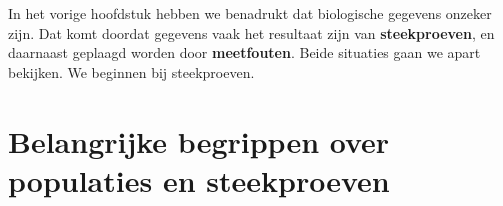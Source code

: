 \documentclass[
  a4paper,
]{scrbook}
\theoremstyle{definition}
\theoremstyle{definition}
\theoremstyle{remark}
\begin{document}
\renewcommand{\ttdefault}{lcmtt}
\providecommand{\ped}[1]{_\textrm{#1}}
\providecommand{\ap}[1]{^\textrm{#1}}
\providecommand{\app}[1]{^\textrm{#1}}

\providecommand*{\angs}{\smash{\mathrm{\ring A}}}
\providecommand*{\celsius}{\mathrm{~\circ C}}
\providecommand*{\micro}{\mu}

\providecommand*{\unit}[1]{\textrm{\,#1}}

\providecommand{\E}{\mathrm{e}}
\providecommand{\I}{\mathrm{i}}
\providecommand{\sfrac}[2]{^{#1}/_{#2}}

\providecommand{\conc}[1]{\left[\mathrm{#1}\right]}

\providecommand{\command}[1]{\textsl{#1}}
\providecommand{\out}[1]{\begin{verbatim}#1\end{verbatim}}

\providecommand{\diff}{\mathrm{d}\,}

\providecommand*{\deriv}[3][]{%
    \frac{\diff^{#1}#2}{\diff #3^{#1}}}
\providecommand*{\pderiv}[3][]{%
    \frac{\partial^{#1}#2}
        {\partial #3^{#1}}}

\renewcommand{\vec}[1]{{\boldsymbol #1}}

\providecommand{\cov}[2]{\mathrm{Cov}\!\left(#1, #2\right)}
\providecommand{\var}[1]{\mathrm{Var}\!\left(#1\right)}

\providecommand{\mean}[1]{\overline{#1}}

\providecommand{\sd}[1]{\sigma\left(#1\right)}
\providecommand{\ev}[1]{\mathbb{E}\!\left(#1\right)}
\providecommand{\pr}[1]{\textrm{Pr}\!\left(#1\right)}

\providecommand{\se}[1]{\mathrm{SE}_{#1}}

\providecommand{\ct}[3]{t_{#1 (#2) #3}}

\providecommand{\HO}{H\ped{0}}
\providecommand{\HA}{H\ped{A}}
\providecommand{\df}{\mathrm{df}}

In het vorige hoofdstuk hebben we benadrukt dat biologische gegevens
onzeker zijn. Dat komt doordat gegevens vaak het resultaat zijn van
\textbf{steekproeven}, en daarnaast geplaagd worden door
\textbf{meetfouten}. Beide situaties gaan we apart bekijken. We beginnen
bij steekproeven.

\section{Belangrijke begrippen over populaties en
steekproeven}\label{belangrijke-begrippen-over-populaties-en-steekproeven}
\end{document}
